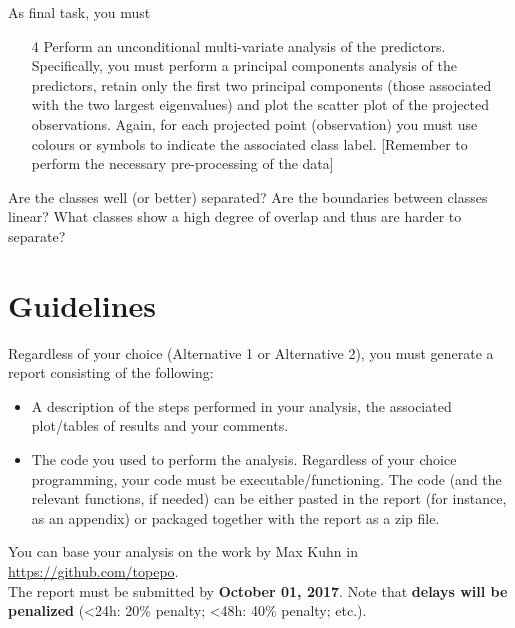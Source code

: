 \documentclass[a4paper,11pt]{article}
\begin{document}
\vskip0.25cm\noindent As final task, you must
\begin{enumerate}
\item[4] Perform an unconditional multi-variate analysis of the predictors. Specifically, you must perform a principal components analysis of the predictors, retain only the first two principal components (those associated with the two largest eigenvalues) and plot the scatter plot of the projected observations. Again, for each projected point (observation) you must use colours or symbols to indicate the associated class label. [Remember to perform the necessary pre-processing of the data]
\end{enumerate}
Are the classes well (or better) separated? Are the boundaries between classes linear? What classes show a high degree of overlap and thus are harder to separate?

\newpage\section*{Guidelines} 
\noindent Regardless of your choice (Alternative 1 or  Alternative 2), you must generate a report consisting of the following:
\begin{itemize}
\item A description of the steps performed in your analysis, the associated plot/tables of results and your comments.
\item The code you used to perform the analysis. Regardless of your choice programming, your code must be executable/functioning. The code (and the relevant functions, if needed) can be either pasted in the report (for instance, as an appendix) or packaged together with the report as a zip file.
\end{itemize}

\noindent You can base your analysis on the work by Max Kuhn in \url{https://github.com/topepo}.\\

\noindent The report must be submitted by {\bf October 01, 2017}. Note that {\bf delays will be penalized} (<24h:  20\% penalty; <48h: 40\% penalty; etc.). \\ 

\end{document}
